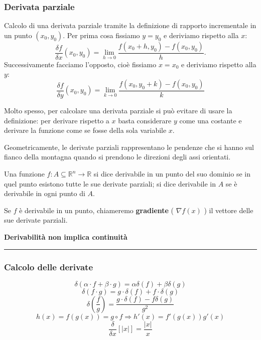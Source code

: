 \subsubsection*{Derivata parziale}
Calcolo di una derivata parziale tramite la definizione di rapporto incrementale in un punto $(x_0, y_0)$. \newline
Per prima cosa fissiamo $y=y_0$ e deriviamo rispetto alla $x$:
\[
    \frac{\delta f}{\delta x} (x_0,y_0) = \lim_{h\rightarrow 0}\frac{f(x_0+h, y_0)- f(x_0,y_0)}{h}.
\]
Successivamente facciamo l'opposto, cioè fissiamo $x=x_0$ e deriviamo rispetto alla $y$:
\[
    \frac{\delta f}{\delta y} (x_0,y_0) = \lim_{k\rightarrow 0}\frac{f(x_0, y_0+k)- f(x_0,y_0)}{k}
\]
\begin{tcolorbox}
Molto spesso, per calcolare una derivata parziale si può evitare di usare la definizione: per derivare rispetto a $x$ basta considerare $y$ come una costante e derivare la funzione come se fosse della sola variabile $x$.
\end{tcolorbox}
Geometricamente, le derivate parziali rappresentano le pendenze che si hanno sul fianco della montagna quando si prendono le direzioni degli assi orientati.\newline
\begin{tcolorbox}
Una funzione $f: A \subseteq \mathbb{R}^n \rightarrow  \mathbb{R}$ si dice derivabile in un punto del suo dominio se in quel punto esistono tutte le sue derivate parziali; si dice derivabile in $A$ se è derivabile in ogni punto di $A$.
\end{tcolorbox}
\begin{tcolorbox}
Se $f$ è derivabile in un punto, chiameremo \textbf{gradiente} ( $\nabla f(x)$ ) il vettore delle sue derivate parziali.
\end{tcolorbox}
\begin{tcolorbox}
    \textbf{Derivabilità non implica continuità}
\end{tcolorbox}
\rule{\textwidth}{0.4pt}
\subsubsection*{Calcolo delle derivate}
\[
    \delta(\alpha \cdot f + \beta \cdot g) = \alpha \delta(f) + \beta \delta (g)
\]
\[
    \delta(f \cdot  g) = g \cdot \delta(f) + f  \cdot \delta(g)
\]
\[
    \delta(\frac{f}{g}) = \frac{ g \cdot \delta(f) - f \delta(g)}{g^2}
\]
\[
    h(x) = f(g(x)) = g \circ f \Rightarrow h'(x) = f'(g(x)) g'(x)
\]
\[
    \frac{\delta}{\delta x} [|x|] = \frac{|x|}{x} 
\]

